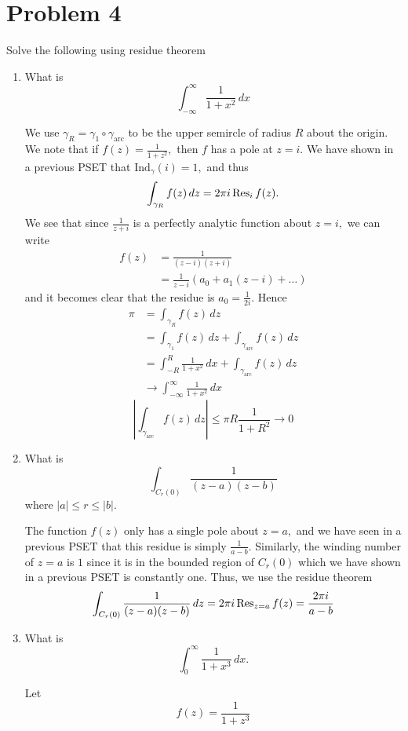 \documentclass[11pt]{article}
\newcommand{\Ind}{\text{Ind}}
\begin{document}
\section*{Problem 4}
Solve the following using residue theorem
\begin{enumerate}
    \item What is 
    \[\int_{-\infty}^\infty \frac{1}{1 + x^2}\,dx\]
    \begin{solution}
We use $\gamma_R = \gamma_1 \circ \gamma_{\text{arc}}$ to be the upper semircle of radius $R$ about the origin. We note that if $f(z) = \frac{1}{1 + z^2},$ then $f$ has a pole at $z = i$. We have shown in a previous PSET that $\Ind_\gamma (i)= 1,$ and thus
\[\int_{\gamma_R} f(z)\,dz=2\pi i \Res_{i}f(z).\] We see that since $\frac{1}{z+ i}$ is a perfectly analytic function about $z = i,$ we can write
\begin{align*}
    f(z) &=\frac{1}{(z-i)(z + i)}\\
    &= \frac{1}{z-i} (a_0 + a_1(z-i)+ \dots)
\end{align*}
and it becomes clear that the residue is $a_0 = \frac{1}{2i}.$ Hence
\begin{align*}
    \pi &= \int_{\gamma_R} f(z)\,dz\\
    &= \int_{\gamma_1}f(z)\,dz + \int_{\gamma_{\text{arc}}} f(z)\,dz\\
    &= \int_{-R}^R \frac{1}{1 + x^2}\,dx + \int_{\gamma_{\text{arc}}} f(z)\,dz\\
    &\to \int_{-\infty}^\infty \frac{1}{1 + x^2}\,dx
\end{align*}
\[\left|\int_{\gamma_{\text{arc}}} f(z)\,dz\right| \leq \pi R \frac{1}{1 + R^2}\to 0\]
    \end{solution}
    \item What is 
\[\int_{C_r(0)}\frac{1}{(z-a)(z-b)}\] where $|a| \leq r \leq |b|.$
\begin{solution}
    The function $f(z)$ only has a single pole about $z = a,$ and we have seen in a previous PSET that this residue is simply $\frac{1}{a - b}.$ Similarly, the winding number of $z = a$ is $1$ since it is in the bounded region of $C_r(0)$ which we have shown in a previous PSET is constantly one. Thus, we use the residue theorem
    \[\int_{C_r(0)} \frac{1}{(z-a)(z-b)}\,dz = 2\pi i \Res_{z=a} f(z) = \frac{2\pi i}{a-b}\]
\end{solution}
    \item What is 
    \[\int_0^\infty \frac{1}{1 + x^3}\,dx.\]
    \begin{solution}
     Let 
    \[f(z)= \frac{1}{1 + z^3}\]



\end{solution}
\end{enumerate}
\end{document}
